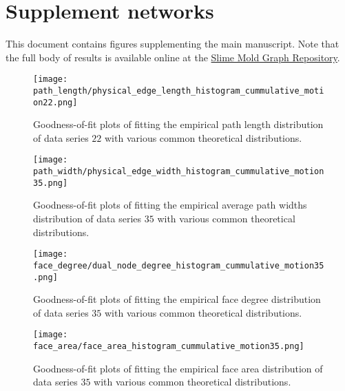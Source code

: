 
\chapter{Supplement networks}

This document contains figures supplementing the main manuscript. Note that the full body of results is available online at the \href{http://smgr.mpi-inf.mpg.de}{Slime Mold Graph Repository}. 


\begin{figure}[!htbp]
\begin{center}%
  \texttt{[image: path\_length/physical\_edge\_length\_histogram\_cummulative\_motion22.png]}
\end{center}%
\caption[Goodness-of-fit plots: path lengths]{Goodness-of-fit plots of fitting the empirical path length distribution of data series $22$ with various common theoretical distributions.}
\label{fig:sup::path_lengths_goodness}
\end{figure}

\begin{figure}[!htbp]
\begin{center}%
  \texttt{[image: path\_width/physical\_edge\_width\_histogram\_cummulative\_motion35.png]}
\end{center}%
\caption[Goodness-of-fit plots: path widths]{Goodness-of-fit plots of fitting the empirical average path widths distribution of data series $35$ with various common theoretical distributions.}
\label{fig:sup::path_widths_goodness}
\end{figure}

\begin{figure}[!htbp]
\begin{center}%
  \texttt{[image: face\_degree/dual\_node\_degree\_histogram\_cummulative\_motion35.png]}
\end{center}%
\caption[Goodness-of-fit plots: face degrees]{Goodness-of-fit plots of fitting the empirical face degree distribution of data series $35$ with various common theoretical distributions.}
\label{fig:sup::face_degree_goodness}
\end{figure}

\begin{figure}[!htbp]
\begin{center}%
  \texttt{[image: face\_area/face\_area\_histogram\_cummulative\_motion35.png]}
\end{center}%
\caption[Goodness-of-fit plots: face area]{Goodness-of-fit plots of fitting the empirical face area distribution of data series $35$ with various common theoretical distributions.}
\label{fig:sup::face_area_goodness}
\end{figure}

